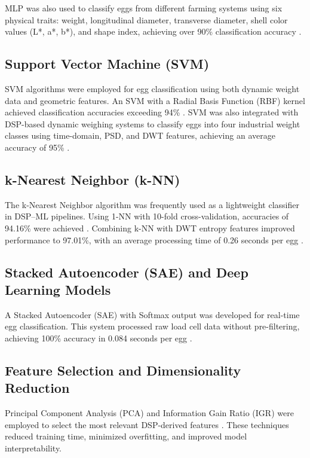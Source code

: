 \documentclass[conference]{IEEEtran}
\begin{document}
	MLP was also used to classify eggs from different farming systems using six physical traits: weight, longitudinal diameter, transverse diameter, shell color values (L*, a*, b*), and shape index, achieving over 90\% classification accuracy \cite{huang2024}.
	
	\subsection{Support Vector Machine (SVM)}
	
	SVM algorithms were employed for egg classification using both dynamic weight data and geometric features. An SVM with a Radial Basis Function (RBF) kernel achieved classification accuracies exceeding 94\% \cite{nasir2018}. SVM was also integrated with DSP-based dynamic weighing systems to classify eggs into four industrial weight classes using time-domain, PSD, and DWT features, achieving an average accuracy of 95\% \cite{secil2020}.
	
	\subsection{k-Nearest Neighbor (k-NN)}
	
	The k-Nearest Neighbor algorithm was frequently used as a lightweight classifier in DSP–ML pipelines. Using 1-NN with 10-fold cross-validation, accuracies of 94.16\% were achieved \cite{nasir2018}. Combining k-NN with DWT entropy features improved performance to 97.01\%, with an average processing time of 0.26 seconds per egg \cite{secil2020}.
	
	\subsection{Stacked Autoencoder (SAE) and Deep Learning Models}
	
	A Stacked Autoencoder (SAE) with Softmax output was developed for real-time egg classification. This system processed raw load cell data without pre-filtering, achieving 100\% accuracy in 0.084 seconds per egg \cite{yabanova2025}.
	
	\subsection{Feature Selection and Dimensionality Reduction}
	
	Principal Component Analysis (PCA) and Information Gain Ratio (IGR) were employed to select the most relevant DSP-derived features \cite{asadi2010}\cite{nasir2018}. These techniques reduced training time, minimized overfitting, and improved model interpretability.
	
\end{document}
